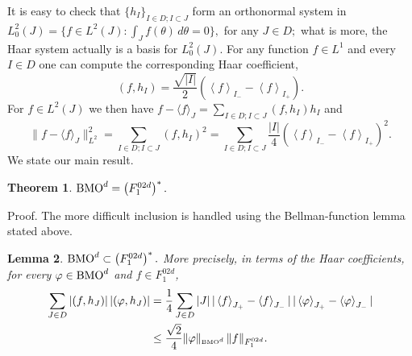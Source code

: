 \documentclass[psamsfonts]{conm-p-l}
\newtheorem{theorem}{Theorem}[section]
\newtheorem{lemma}[theorem]{Lemma}
\theoremstyle{definition}
\theoremstyle{remark}
\numberwithin{equation}{section}
\begin{document}
It is easy to check that $\{h_I\}_{I\in D;I\subset J}$ form an orthonormal system in $L^2_0(J)=\{f\in L^2(J):\int_Jf(\theta)\,d\theta=0\},$ for any $J\in D;$ what is more, the Haar system actually is a basis for $L^2_0(J).$ For any function $f\in L^1$ and every $I\in D$ one can compute the corresponding Haar
coefficient, 
$$
(f,h_I)=\frac{\sqrt{|I|}}2\left(\left<f\right>_{I_-}-\left<f\right>_{I_+}\right).
$$
For $f\in L^2(J)$ we then have $f-\langle f\rangle_J=\sum_{I\in D;I\subset J}(f,h_I)h_I$ and 
$$
\|f-\langle f\rangle_J\|^2_{L^2}=\sum_{I\in D;I\subset J}(f,h_I)^2=\sum_{I\in D;I\subset J}\frac{|I|}4\left(\left<f\right>_{I_-}-\left<f\right>_{I_+}\right)^2.
$$
We state our main result.
\begin{theorem}
${\displaystyle} {{\rm{BMO}}}^d=\left({F^{02d}_1}\right)^*.$  
\end{theorem}
{\sc Proof.} The more difficult inclusion is handled using the Bellman-function lemma stated above.
\begin{lemma}${\displaystyle} {{\rm{BMO}}}^d\subset \left({F^{02d}_1}\right)^*.$ More precisely, in terms of the Haar coefficients, for every ${\displaystyle} \varphi\in {{\rm{BMO}}}^d$ and $f\in {F^{02d}_1}$,
\begin{align}
\label{d09}
\sum_{J\in D}|(f,h_J)|\,|(\varphi,h_J)|&=\frac14\sum_{J\in D}|J|\,|\left<f\right>_{J_+}-\left<f\right>_{J_-}|\,|\left<\varphi\right>_{J_+}-\left<\varphi\right>_{J_-}|\\*
\notag&\le
\frac{\sqrt2}4\|\varphi\|_{\scriptscriptstyle {{\rm{BMO}}}^d}\,\| f \|_{F^{02d}_1}.
\end{align}
\end{lemma}
\end{document}
